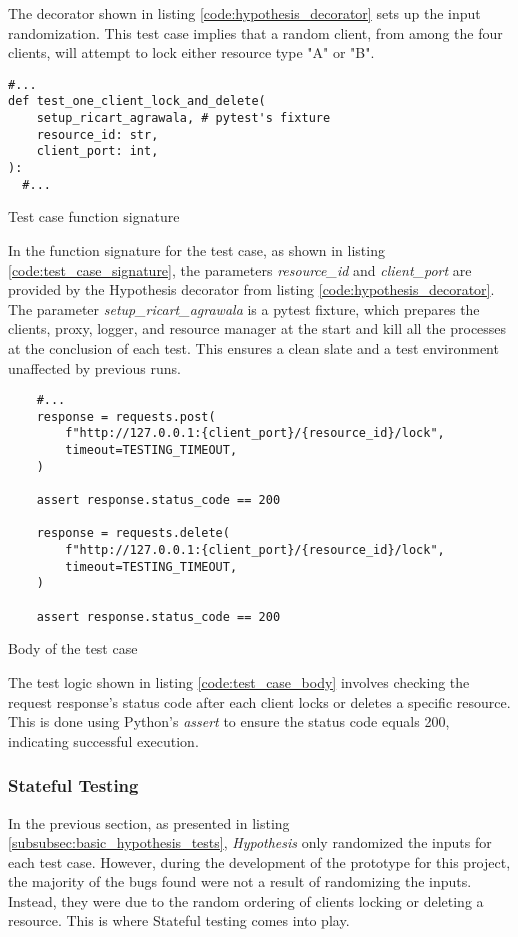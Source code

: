 The decorator shown in listing \ref{code:hypothesis_decorator} sets up the input randomization. This test case implies that a random client, from among the four clients, will attempt to lock either resource type "A" or "B".


\begin{listing}[!ht]
  \begin{verbatim}
#...
def test_one_client_lock_and_delete(
    setup_ricart_agrawala, # pytest's fixture
    resource_id: str,
    client_port: int,
):
  #...
  \end{verbatim}
  \caption{Test case function signature}
  \label{code:test_case_signature}
\end{listing}

In the function signature for the test case, as shown in listing
\ref{code:test_case_signature}, the parameters \textit{resource\_id} and
\textit{client\_port} are provided by the Hypothesis decorator from listing \ref{code:hypothesis_decorator}. 
The parameter \textit{setup\_ricart\_agrawala} is a pytest fixture, which
prepares the clients, proxy, logger, and resource manager at the start and kill
all the processes at the 
conclusion of each test. This ensures a clean slate and a test environment unaffected by previous runs.


\begin{listing}[!ht]
  \begin{verbatim}
    #...
    response = requests.post(
        f"http://127.0.0.1:{client_port}/{resource_id}/lock",
        timeout=TESTING_TIMEOUT,
    )

    assert response.status_code == 200

    response = requests.delete(
        f"http://127.0.0.1:{client_port}/{resource_id}/lock",
        timeout=TESTING_TIMEOUT,
    )

    assert response.status_code == 200
  \end{verbatim}
  \caption{Body of the test case}
  \label{code:test_case_body}
\end{listing}


The test logic shown in listing \ref{code:test_case_body} involves checking the request response's status code after each client locks or deletes a specific resource. This is done using Python's \textit{assert} to ensure the status code equals 200, indicating successful execution.

\subsubsection{Stateful Testing}
\label{subsubsec:stateful_testing}
In the previous section, as presented in listing \ref{subsubsec:basic_hypothesis_tests}, \textit{Hypothesis} only randomized the inputs for each test case. However, during the development of the prototype for this project, the majority of the bugs found were not a result of randomizing the inputs. Instead, they were due to the random ordering of clients locking or deleting a resource. This is where Stateful testing comes into play.


